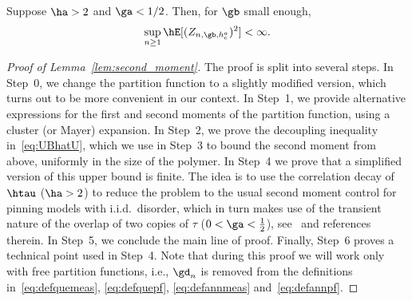 \begin{lemm}\label{lem:second_moment}
Suppose $\ha > 2$ and $\ga < 1/2$. Then, for $\gb$ small enough,
\begin{equation}
\sup_{n\geq1} \hE[(Z_{n,\gb,h_c^a})^2] < \infty.
\end{equation}
\end{lemm}

\begin{proof}[Proof of Lemma~\ref{lem:second_moment}] The proof is split into several steps. In Step~0, we change the partition function to a slightly modified version, which turns out to be more convenient in our context. In Step~1, we provide alternative expressions for the first and second moments of the partition function, using a cluster (or Mayer) expansion. In Step~2, we prove the decoupling inequality in~\eqref{eq:UBhatU}, which we use in Step~3 to bound the second moment from above, uniformly in the size of the polymer. In Step~4 we prove that a simplified version of this upper bound is finite. The idea is to use the correlation decay of $\htau$ ($\ha > 2$) to reduce the problem to the usual second moment control for pinning models with i.i.d.~disorder, which in turn makes use of the transient nature of the overlap of two copies of $\tau$ ($0 < \ga < \frac{1}{2}$), see~\cite{Gi2011} and references therein. In Step~5, we conclude the main line of proof. Finally, Step~6 proves a technical point used in Step~4. Note that during this proof we will work only with free partition functions, i.e., $\gd_n$ is removed from the definitions in~\eqref{eq:defquemeas}, \eqref{eq:defquepf}, \eqref{eq:defannmeas} and~\eqref{eq:defannpf}.
\smallskip


\end{proof}

